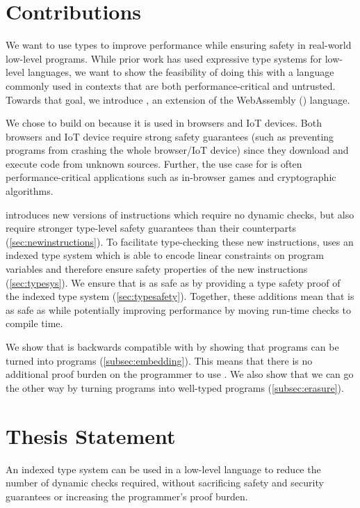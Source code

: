 \section{Contributions}
We want to use types to improve performance while ensuring safety in real-world low-level programs.
While prior work has used expressive type systems for low-level languages, we want to show the feasibility of doing this with a language commonly used in contexts that are both performance-critical and untrusted.
Towards that goal, we introduce \name, an extension of the WebAssembly (\wasm) language.

We chose \wasm to build on because it is used in browsers and IoT devices.
Both browsers and IoT device require strong safety guarantees (such as preventing programs from crashing the whole browser/IoT device) since they download and execute code from unknown sources.
Further, the use case for \wasm is often performance-critical applications such as in-browser games and cryptographic algorithms.

\name introduces new versions of \wasm instructions which require no dynamic checks, but also require stronger type-level safety guarantees than their \wasm counterparts (\autoref{sec:newinstructions}).
To facilitate type-checking these new instructions, \name uses an indexed type system which is able to encode linear constraints on program variables and therefore ensure safety properties of the new \name instructions (\autoref{sec:typesys}).
We ensure that \name is as safe as \wasm by providing a type safety proof of the \name indexed type system (\autoref{sec:typesafety}).
Together, these additions mean that \name is as safe as \wasm while potentially improving performance by moving run-time checks to compile time.

We show that \name is backwards compatible with \wasm by showing that \wasm programs can be turned into \name programs (\autoref{subsec:embedding}).
This means that there is no additional proof burden on the programmer to use \name.
We also show that we can go the other way by turning \name programs into well-typed \wasm programs (\autoref{subsec:erasure}).

\section{Thesis Statement}
\begin{adjustwidth}{1cm}{1cm}
    An indexed type system can be used in a low-level language to reduce the number of dynamic checks required, without sacrificing safety and security guarantees or increasing the programmer's proof burden.
\end{adjustwidth}
